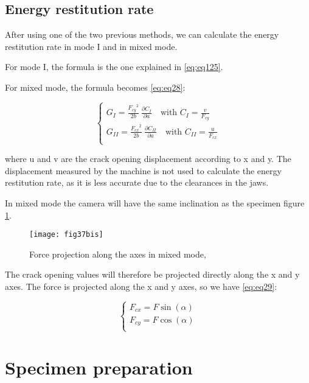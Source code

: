 \subsection{Energy restitution rate}

After using one of the two previous methods, we can calculate the energy restitution rate in mode I and in mixed mode.

For mode I, the formula is the one explained in \ref{eq:eq125}.

For mixed mode, the formula becomes \ref{eq:eq28}:

\begin{equation}
	\begin{cases}
		G_I=\frac{{F_{cy}}^2}{2b}\ \frac{\partial C_I}{\partial a} \quad \text{with } C_I=\frac{v}{F_{cy}} \\
		G_{II}=\frac{{F_{cx}}^2}{2b}\ \frac{\partial C_{II}}{\partial a} \quad \text{with } C_{II}=\frac{u}{F_{cx}}\\ 
	\end{cases}
\label{eq:eq28}
\end{equation}

where u and v are the crack opening displacement according to x and y. The displacement measured by the machine is not used to calculate the energy restitution rate, as it is less accurate due to the clearances in the jaws.

In mixed mode the camera will have the same inclination as the specimen figure \ref{fig:fig37bis}.

\begin{figure}[htp]
	\centering
	\texttt{[image: fig37bis]}
	\caption{Force projection along the axes in mixed mode, \cite{Odounga2018phd}}
	\label{fig:fig37bis}
\end{figure}

The crack opening values will therefore be projected directly along the x and y axes. The force is projected along the x and y axes, so we have \ref{eq:eq29}:


\begin{equation}
	\begin{cases}
		F_{cx}=F \sin(\alpha) \\
		F_{cy}=F \cos(\alpha) \\ 
	\end{cases}
	\label{eq:eq29}
\end{equation}


\section{Specimen preparation}

